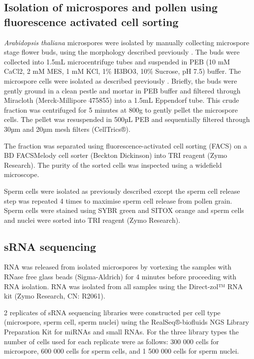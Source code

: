 \subsection{Isolation of microspores and pollen using fluorescence activated cell sorting}

\textit{Arabidopsis thaliana} microspores were isolated by manually collecting microspore stage flower buds, using the morphology described previously \citep{RN86}. The buds were collected into 1.5mL microcentrifuge tubes and suspended in PEB (10 mM CaCl2, 2 mM MES, 1 mM KCl, 1\% H3BO3, 10\% Sucrose, pH 7.5) buffer. The microspore cells were isolated as described previously \citep{RN140}. Briefly, the buds were gently ground in a clean pestle and mortar in PEB buffer and filtered through Miracloth (Merck-Millipore 475855) into a 1.5mL Eppendorf tube. This crude fraction was centrifuged for 5 minutes at 800g to gently pellet the microspore cells. The pellet was resuspended in 500µL PEB and sequentially filtered through 30µm and 20µm mesh filters (CellTrics®).

The fraction was separated using fluorescence-activated cell sorting (FACS) on a BD FACSMelody cell sorter (Beckton Dickinson) into TRI reagent (Zymo Research). The purity of the sorted cells was inspected using a widefield microscope.

Sperm cells were isolated as previously described \citep{RN140,RN141} except the sperm cell release step was repeated 4 times to maximise sperm cell release from pollen grain. Sperm cells were stained using SYBR green and SITOX orange and sperm cells and nuclei were sorted into TRI reagent (Zymo Research).

\subsection{sRNA sequencing}

RNA was released from isolated microspores by vortexing the samples with RNase free glass beads (Sigma-Aldrich) for 4 minutes before proceeding with RNA isolation. RNA was isolated from all samples using the Direct-zol™ RNA kit (Zymo Research, CN: R2061).

2 replicates of sRNA sequencing libraries were constructed per cell type (microspore, sperm cell, sperm nuclei) using the RealSeq®-biofluids NGS Library Preparation Kit for miRNAs and small RNAs. For the three library types the number of cells used for each replicate were as follows: 300 000 cells for microspore, 600 000 cells for sperm cells, and 1 500 000 cells for sperm nuclei.

